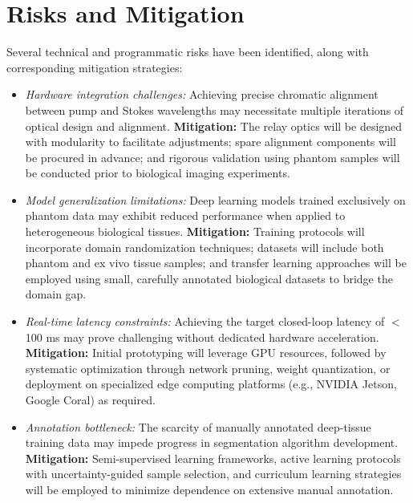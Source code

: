 \documentclass[12pt,a4paper]{article}
\begin{document}

\section{Risks and Mitigation}
Several technical and programmatic risks have been identified, along with corresponding mitigation strategies:
\begin{itemize}
  \item \textit{Hardware integration challenges:} Achieving precise chromatic alignment between pump and Stokes wavelengths may necessitate multiple iterations of optical design and alignment. \textbf{Mitigation:} The relay optics will be designed with modularity to facilitate adjustments; spare alignment components will be procured in advance; and rigorous validation using phantom samples will be conducted prior to biological imaging experiments.
  \item \textit{Model generalization limitations:} Deep learning models trained exclusively on phantom data may exhibit reduced performance when applied to heterogeneous biological tissues. \textbf{Mitigation:} Training protocols will incorporate domain randomization techniques; datasets will include both phantom and ex vivo tissue samples; and transfer learning approaches will be employed using small, carefully annotated biological datasets to bridge the domain gap.
  \item \textit{Real-time latency constraints:} Achieving the target closed-loop latency of $<$100 ms may prove challenging without dedicated hardware acceleration. \textbf{Mitigation:} Initial prototyping will leverage GPU resources, followed by systematic optimization through network pruning, weight quantization, or deployment on specialized edge computing platforms (e.g., NVIDIA Jetson, Google Coral) as required.
  \item \textit{Annotation bottleneck:} The scarcity of manually annotated deep-tissue training data may impede progress in segmentation algorithm development. \textbf{Mitigation:} Semi-supervised learning frameworks, active learning protocols with uncertainty-guided sample selection, and curriculum learning strategies will be employed to minimize dependence on extensive manual annotation.
\end{itemize}
\end{document}
